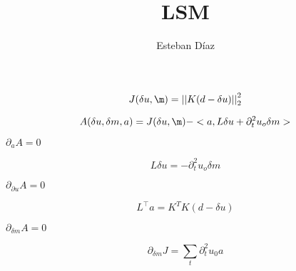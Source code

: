 


\huge
{}
\linethickness{0.2mm}

\title[]{ LSM }
\author[]{Esteban  D\'{i}az}
\date{}
\logo{}


\def\big#1{\begin{center} \LARGE \textbf{#1} \end{center}}
\def\cen#1{\begin{center}        \textbf{#1} \end{center}}

 { \cwpcover }

\begin{frame}
 \[
    J(\delta u,\m) = \ltnorm { K(d -\delta u)}
  \]
\end{frame}



\begin{frame}
 \[
    A(\delta u,\delta m, a) = J(\delta u,\m) - <a,L \delta u +\partial^2_t u_o \delta m> 
  \]
\end{frame}


\begin{frame}
  $\partial_{a } A =0$

  \[
    L \delta u =-\partial^2_t u_o \delta m
  \]
\end{frame}

\begin{frame}
  $\partial_{\partial u } A =0$

  \[
    L^\top a = K^T K(d - \delta u)
  \]
\end{frame}
\begin{frame}
  $\partial_{\delta m } A =0$

  \[
    \partial_{\delta m} J = \sum_t \partial^2_t u_0 a
  \]
\end{frame}




